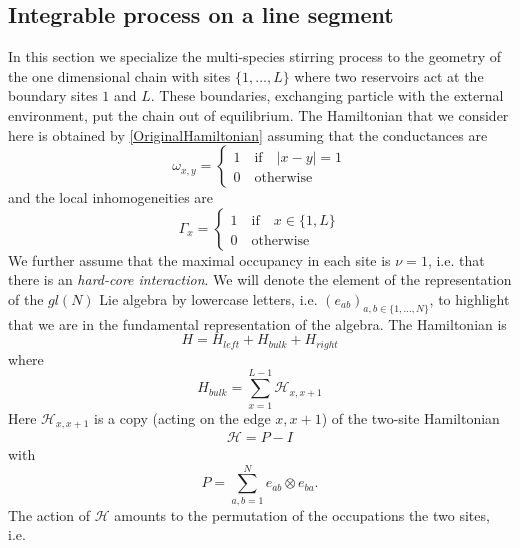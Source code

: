 \documentclass[10pt]{article}
\numberwithin{equation}{section}
\numberwithin{equation}{subsection}
\newcommand{\id}{I}
\begin{document}
\subsection{Integrable process on a line segment}
In this section we specialize the multi-species stirring process to the geometry of the one dimensional chain with sites $\{1,\ldots,L\}$ where two reservoirs act at the boundary sites $1$ and $L$. These boundaries, exchanging particle with the external environment, put the chain out of equilibrium. The Hamiltonian that we consider here is obtained by \eqref{OriginalHamiltonian} assuming that the conductances are
\begin{equation}
	\omega_{x,y}=\begin{cases}
		1 \quad \text{if}\quad |x-y|=1\\
		0\quad \text{otherwise}
	\end{cases}
\end{equation}
and the local inhomogeneities are
\begin{equation}
	\Gamma_{x}=\begin{cases}
		1\quad \text{if} \quad x\in \{1,L\}\\
		0\quad \text{otherwise}
	\end{cases}
\end{equation}
We further assume that the maximal occupancy in each site is $\nu=1$, i.e. that there is an \textit{hard-core interaction}.
We will denote the element of the representation of the $gl(N)$ Lie algebra by lowercase letters, i.e. $(e_{ab})_{a,b\in\{1,\ldots,N\}}$, to highlight that we are in  the fundamental representation of the algebra.
The Hamiltonian is
\begin{equation}\label{hamiltonian}
	H=H_{left}+H_{bulk}+H_{right}
\end{equation}
where
\begin{equation}
	H_{bulk}=\sum_{x=1}^{L-1}\mathcal{H}_{x,x+1}
\end{equation}
Here $\mathcal{H}_{x,x+1}$  is a copy (acting on the edge $x,x+1$) of the two-site Hamiltonian
\begin{equation}
	\begin{split}
		\mathcal{H}=P-\id
	\end{split}
\end{equation}
with 
\begin{equation}
	P=\sum_{a,b=1}^Ne_{ab}\otimes e_{ba}.
\end{equation} 
The action of $\mathcal{H}$ amounts to the permutation of the occupations the two sites, i.e.
\end{document}
